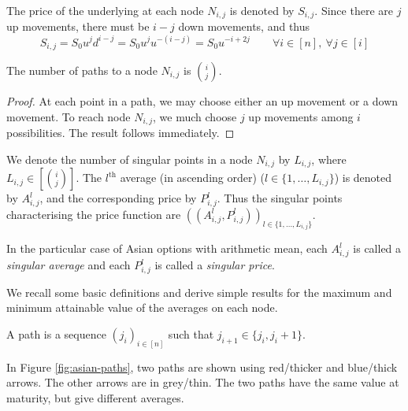 The price of the underlying at each node $ N_{i,j} $ is denoted by $ S_{i,j} $. Since there are $j$ up movements, there must be $ i-j $ down movements, and thus
\begin{equation} \label{eq:asian-am-ij}
	S_{i,j} = S_0 u^{j} d^{i-j} = S_0 u^{j} u^{-(i-j)} = S_0 u^{-i+2j} \qquad \forall i \in [n], \ \forall j \in [i]
\end{equation}


\begin{prp}
	The number of paths to a node $ N_{i,j} $ is $ \binom{i}{j} $.
\end{prp}

\begin{proof}
	At each point in a path, we may choose either an up movement or a down movement. To reach node $ N_{i,j} $, we much choose $j$ up movements among $i$ possibilities. The result follows immediately.
\end{proof}


We denote the number of singular points in a node $ N_{i,j} $ by $ L_{i,j} $, where $ L_{i,j} \in \left[ \binom{i}{j} \right] $. The $ l^\mathrm{th} $ average (in ascending order) ($ l \in \{ 1, \dots, L_{i,j} \} $) is denoted by $ A_{i,j}^l $, and the corresponding price by $ P_{i,j}^l $. Thus the singular points characterising the price function are $ ( ( A_{i,j}^l, P_{i,j}^l ) )_{l \in \{ 1, \dots, L_{i,j} \} } $.


\begin{dfn}
	In the particular case of Asian options with arithmetic mean, each $ A_{i,j}^l $ is called a \emph{singular average} and each $ P_{i,j}^l $ is called a  \emph{singular price}.
\end{dfn}


We recall some basic definitions and derive simple results for the maximum and minimum attainable value of the averages on each node.


\begin{dfn}[Path]
	A path is a sequence $(j_i)_{i \in [n]}$ such that $j_{i+1} \in \{ j_i,j_i+1 \}$.
\end{dfn}

\begin{eg}
	In Figure \ref{fig:asian-paths}, two paths are shown using red/thicker and blue/thick arrows. The other arrows are in grey/thin. The two paths have the same value at maturity, but give different averages.
\end{eg}


